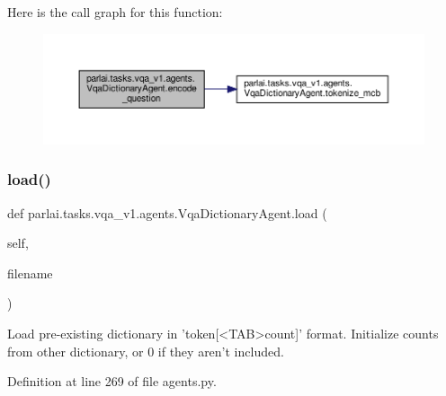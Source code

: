 Here is the call graph for this function\+:
\nopagebreak
\begin{figure}[H]
\begin{center}
\leavevmode
\includegraphics[width=350pt]{classparlai_1_1tasks_1_1vqa__v1_1_1agents_1_1VqaDictionaryAgent_af2c2144d6a142cb70d8954b00d3a3720_cgraph}
\end{center}
\end{figure}
\mbox{\label{classparlai_1_1tasks_1_1vqa__v1_1_1agents_1_1VqaDictionaryAgent_ac84980d21c96740bb94d4215256937ac}} 
\subsubsection{\texorpdfstring{load()}{load()}}
{\footnotesize\ttfamily def parlai.\+tasks.\+vqa\+\_\+v1.\+agents.\+Vqa\+Dictionary\+Agent.\+load (\begin{DoxyParamCaption}\item[{}]{self,  }\item[{}]{filename }\end{DoxyParamCaption})}

\begin{DoxyVerb}Load pre-existing dictionary in 'token[<TAB>count]' format.
Initialize counts from other dictionary, or 0 if they aren't included.
\end{DoxyVerb}
 

Definition at line 269 of file agents.\+py.



